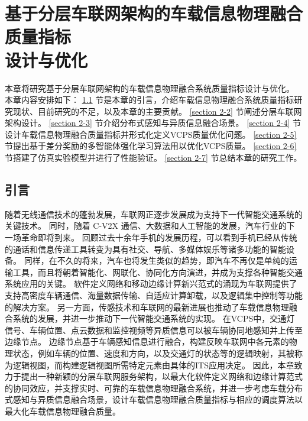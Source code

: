 \chapter[基于分层车联网架构的车载信息物理融合质量指标设计与优化]{基于分层车联网架构的车载信息物理融合质量指标\\设计与优化}
本章将研究基于分层车联网架构的车载信息物理融合系统质量指标设计与优化。
本章内容安排如下：
\ref{section 2-1} 节是本章的引言，介绍车载信息物理融合系统质量指标研究现状、目前研究的不足，以及本章的主要贡献。
\ref{section 2-2} 节阐述分层车联网架构设计。
\ref{section 2-3} 节介绍分布式感知与异质信息融合场景。
\ref{section 2-4} 节设计车载信息物理融合质量指标并形式化定义VCPS质量优化问题。
\ref{section 2-5} 节提出基于差分奖励的多智能体强化学习算法用以优化VCPS质量。
\ref{section 2-6} 节搭建了仿真实验模型并进行了性能验证。
\ref{section 2-7} 节总结本章的研究工作。

\section{引言}\label{section 2-1}

随着无线通信技术的蓬勃发展，车联网正逐步发展成为支持下一代智能交通系统的关键技术。
同时，随着 C-V2X 通信、大数据和人工智能的发展，汽车行业的下一场革命即将到来。
回顾过去十余年手机的发展历程，可以看到手机已经从传统的通话和信息传递工具转变为具有社交、导航、多媒体娱乐等诸多功能的智能设备。
同样，在不久的将来，汽车也将发生类似的趋势，即汽车不再仅是单纯的运输工具，而且将朝着智能化、网联化、协同化方向演进，并成为支撑各种智能交通系统应用的关键。
软件定义网络\cite{li2021zhi}和移动边缘计算\cite{liu2022fedcpf}新兴范式的涌现为车联网提供了支持高密度车辆通信、海量数据传输、自适应计算卸载，以及逻辑集中控制等功能的解决方案。
另一方面，传感技术和车联网的最新进展也推动了车载信息物理融合系统\cite{jia2015survey}的发展，并进一步推动下一代智能交通系统的实现。
在VCPS中，交通灯信号、车辆位置、点云数据和监控视频等异质信息可以被车辆协同地感知并上传至边缘节点。
边缘节点基于车辆感知信息进行融合，构建反映车联网中各元素的物理状态，例如车辆的位置、速度和方向，以及交通灯的状态等的逻辑映射，其被称为逻辑视图，而构建逻辑视图所需特定元素由具体的ITS应用决定。
因此，本章致力于提出一种新颖的分层车联网服务架构，以最大化软件定义网络和边缘计算范式的协同效应，并支撑实时、可靠的车载信息物理融合系统，并进一步考虑车载分布式感知与异质信息融合场景，设计车载信息物理融合质量指标与相应的调度算法以最大化车载信息物理融合质量。

